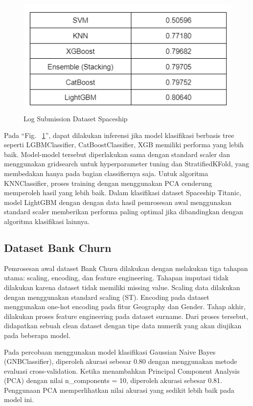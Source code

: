 \documentclass[conference]{IEEEtran}
\begin{document}
\begin{figure}[htbp]
    \centerline{\includegraphics[scale=0.5]{spaceship_log.png}}
    \caption{Log Submission Dataset Spaceship}
    \label{spaceship_log}
\end{figure}

Pada ``Fig. ~\ref{spaceship_log}'', dapat dilakukan inferensi jika model klasifikasi berbasis tree seperti LGBMClassifier, CatBoostClassifier, XGB memiliki performa yang lebih baik. 
Model-model tersebut diperlakukan sama dengan standard scaler dan menggunakan gridsearch untuk hyperparameter tuning dan StratifiedKFold, yang membedakan hanya pada bagian classifiernya saja. 
Untuk algoritma KNNClassifier, proses training dengan menggunakan PCA cenderung memperoleh hasil yang lebih baik. Dalam klasifikasi dataset Spaceship Titanic, model 
LightGBM dengan dengan data hasil pemrosesan awal menggunakan standard scaler memberikan performa paling optimal jika dibandingkan dengan algoritma klasifikasi lainnya.

\subsection{Dataset Bank Churn}
Pemrosesan awal dataset Bank Churn dilakukan dengan melakukan tiga tahapan utama: scaling, encoding, dan feature engineering. Tahapan imputasi tidak dilakukan karena dataset tidak memiliki missing value. 
Scaling data dilakukan dengan menggunakan standard scaling (ST). Encoding pada dataset menggunakan one-hot encoding pada fitur Geography dan Gender. Tahap akhir, dilakukan proses feature engineering pada dataset surname. 
Dari proses tersebut, didapatkan sebuah clean dataset dengan tipe data numerik yang akan diujikan pada beberapa model.

Pada percobaan menggunakan model klasifikasi Gaussian Naive Bayes (GNBClassifier), diperoleh akurasi sebesar 0.80 dengan menggunakan metode evaluasi cross-validation. Ketika menambahkan Principal Component Analysis (PCA) dengan nilai 
n\_components = 10, diperoleh akurasi sebesar 0.81. Penggunaan PCA memperlihatkan nilai akurasi yang sedikit lebih baik pada model ini. 
\end{document}
